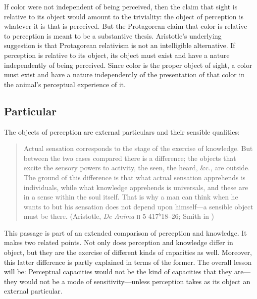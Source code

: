 If color were not independent of being perceived, then the claim that sight is relative to its object would amount to the triviality: the object of perception is whatever it is that is perceived. But the Protagorean claim that color is relative to perception is meant to be a substantive thesis. Aristotle's underlying suggestion is that Protagorean relativism is not an intelligible alternative. If perception is relative to its object, its object must exist and have a nature independently of being perceived. Since color is the proper object of sight, a color must exist and have a nature independently of the presentation of that color in the animal's perceptual experience of it.



\subsection{Particular} %
\label{sub:particular}
The objects of perception are external particulars and their sensible qualities:
\begin{quote}
	Actual sensation corresponds to the stage of the exercise of knowledge. But between the two cases compared there is a difference; the objects that excite the sensory powers to activity, the seen, the heard, \&c., are outside. The ground of this difference is that what actual sensation apprehends is individuals, while what knowledge apprehends is universals, and these are in a sense within the soul itself. That is why a man can think when he wants to but his sensation does not depend upon himself---a sensible object must be there. (Aristotle, \emph{De Anima} \textsc{ii} 5 417\( ^{b} \)18--26; Smith in \citealt[31]{Barnes:1984uq})
\end{quote}
This passage is part of an extended comparison of perception and knowledge. It makes two related points. Not only does perception and knowledge differ in object, but they are the exercise of different kinds of capacities as well. Moreover, this latter difference is partly explained in terms of the former. The overall lesson will be: Perceptual capacities would not be the kind of capacities that they are---they would not be a mode of sensitivity---unless perception takes as its object an external particular.

